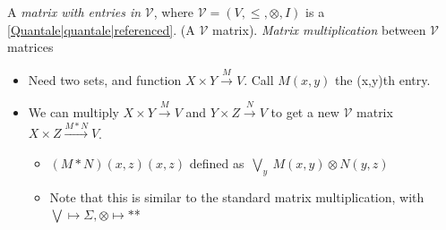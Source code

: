 
A \emph{matrix with entries in} $\mathcal{V}$, where $\mathcal{V}=(V, \leq, \otimes, I)$ is a \ref{Quantale|quantale|referenced}. (A $\mathcal{V}$ matrix). \emph{Matrix multiplication} between $\mathcal{V}$ matrices

\begin{itemize}
    \item  Need two sets, and function $X \times Y \xrightarrow{M} V$. Call $M(x,y)$ the (x,y)th entry.
    \item We can multiply $X \times Y \xrightarrow{M} V$ and $Y \times Z \xrightarrow{N} V$ to get a new $\mathcal{V}$ matrix $X \times Z \xrightarrow{M*N} V$.
          \begin{itemize}
            \item $(M*N)(x,z)(x,z)$ defined as \,$\bigvee_y\ M(x,y)\otimes N(y,z)$\,
            \item Note that this is similar to the standard matrix multiplication, with $\bigvee \mapsto \Sigma, \otimes \mapsto *$*
          \end{itemize}
  \end{itemize}
